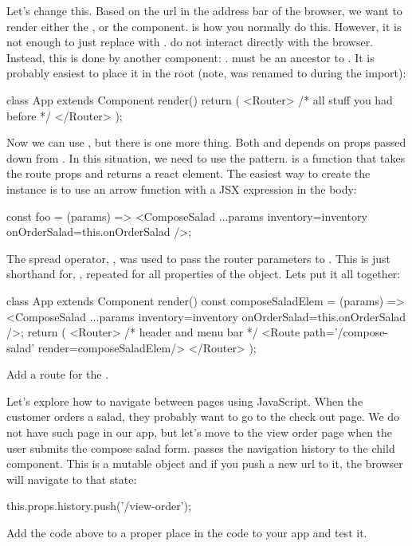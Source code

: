 \documentclass[fleqn, article, a4paper]{memoir}
\begin{document}
\begin{Assignments}
\item Let's change this. Based on the url in the address bar of the browser, we want to render either the , or the  component.  is how you normally do this. However, it is not enough to just replace  with .  do not interact directly with the browser. Instead, this is done by another component: .  must be an ancestor to . It is probably easiest to place it in the root (note,  was renamed to  during the import):
\begin{Code}
class App extends Component {
  render() {
    return (
      <Router>
        {/* all stuff you had before */}
      </Router>
    );
  }
}
\end{Code}
Now we can use , but there is one more thing. Both  and  depends on props passed down from . In this situation, we need to use the  pattern.  is a function that takes the route props and returns a react element. The easiest way to create the instance is to use an arrow function with a JSX expression in the body:
\begin{Code}
const foo = (params) => <ComposeSalad {...params} inventory={inventory} 
  onOrderSalad={this.onOrderSalad} />;
\end{Code}
The spread operator, , was used to pass the router parameters to . This is just shorthand for, , repeated for all properties of the  object. Lets put it all together:
\begin{Code}
class App extends Component {
  render() {
    const composeSaladElem = (params) => <ComposeSalad {...params} inventory={inventory} 
                       onOrderSalad={this.onOrderSalad} />;
    return (
      <Router>
        {/* header and menu bar */}
        <Route path='/compose-salad' render={composeSaladElem}/>
      </Router>
    );
  }
}
\end{Code}
Add a route for the .

\item Let's explore how to navigate between pages using JavaScript. When the customer orders a salad, they probably want to go to the check out page. We do not have such page in our app, but let's move to the view order page when the user submits the compose salad form.  passes the navigation history to the child component. This is a mutable object and if you push a new url to it, the browser will navigate to that state:
\begin{Code}
this.props.history.push('/view-order');
\end{Code}
Add the code above to a proper place in the code to your app and test it.


\end{Assignments}
\end{document}
